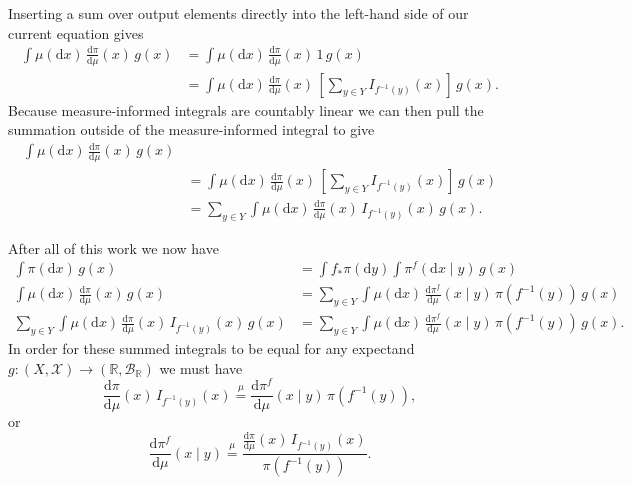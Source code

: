 \documentclass[
  letterpaper,
  DIV=11,
  numbers=noendperiod]{scrartcl}
\begin{document}
Inserting a sum over output elements directly into the left-hand side of
our current equation gives \begin{align*}
\int \mu( \mathrm{d} x ) \, \frac{ \mathrm{d}  \pi }{ \mathrm{d}  \mu  }(x) \, g(x)
&=
\int \mu( \mathrm{d} x ) \, \frac{ \mathrm{d}  \pi }{ \mathrm{d}  \mu  }(x) \, 1 \, g(x)
\\
&=
\int \mu( \mathrm{d} x ) \, \frac{ \mathrm{d}  \pi }{ \mathrm{d}  \mu  }(x) \,
\left[ \sum_{y \in Y} I_{f^{-1}(y)}(x) \right] \, g(x).
\end{align*} Because measure-informed integrals are countably linear we
can then pull the summation outside of the measure-informed integral to
give \begin{align*}
\int \mu( \mathrm{d} x ) \, \frac{ \mathrm{d}  \pi }{ \mathrm{d}  \mu  }(x) \, g(x)
\\
&=
\int \mu( \mathrm{d} x ) \, \frac{ \mathrm{d}  \pi }{ \mathrm{d}  \mu  }(x) \,
\left[ \sum_{y \in Y} I_{f^{-1}(y)}(x) \right] \, g(x)
\\
&=
\sum_{y \in Y} \int \mu( \mathrm{d} x ) \, \frac{ \mathrm{d}  \pi }{ \mathrm{d}  \mu  }(x) \,
I_{f^{-1}(y)}(x) \, g(x).
\end{align*}

After all of this work we now have \begin{align*}
\int \pi( \mathrm{d} x ) \, g(x)
&=
\int f_{*} \pi (\mathrm{d} y)
\int \pi^{f}( \mathrm{d} x \mid y ) \, g(x)
\\
\int \mu( \mathrm{d} x ) \, \frac{ \mathrm{d}  \pi }{ \mathrm{d}  \mu  }(x) \, g(x)
&=
\sum_{y \in Y} \int \mu( \mathrm{d} x) \,
\frac{ \mathrm{d}  \pi^{f} }{ \mathrm{d}  \mu  }( x \mid y ) \,
\pi ( f^{-1}(y) ) \, g(x)
\\
\sum_{y \in Y} \int \mu( \mathrm{d} x ) \, \frac{ \mathrm{d}  \pi }{ \mathrm{d}  \mu  }(x) \,
I_{f^{-1}(y)}(x) \, g(x)
&=
\sum_{y \in Y} \int \mu( \mathrm{d} x) \,
\frac{ \mathrm{d}  \pi^{f} }{ \mathrm{d}  \mu  }( x \mid y ) \,
\pi ( f^{-1}(y) ) \, g(x).
\end{align*} In order for these summed integrals to be equal for any
expectand
\(g : (X, \mathcal{X}) \rightarrow (\mathbb{R}, \mathcal{B}_{\mathbb{R}})\)
we must have \[
\frac{ \mathrm{d}  \pi }{ \mathrm{d}  \mu  }(x) \,
I_{f^{-1}(y)}(x)
\overset{ \mu }{ = }
\frac{ \mathrm{d}  \pi^{f} }{ \mathrm{d}  \mu  }( x \mid y ) \,
\pi ( f^{-1}(y) ),
\] or \[
\frac{ \mathrm{d}  \pi^{f} }{ \mathrm{d}  \mu  }( x \mid y )
\overset{ \mu }{ = }
\frac{ \frac{ \mathrm{d}  \pi }{ \mathrm{d}  \mu  }(x) \, I_{f^{-1}(y)}(x) }{ \pi ( f^{-1}(y) ) }.
\]
\end{document}
